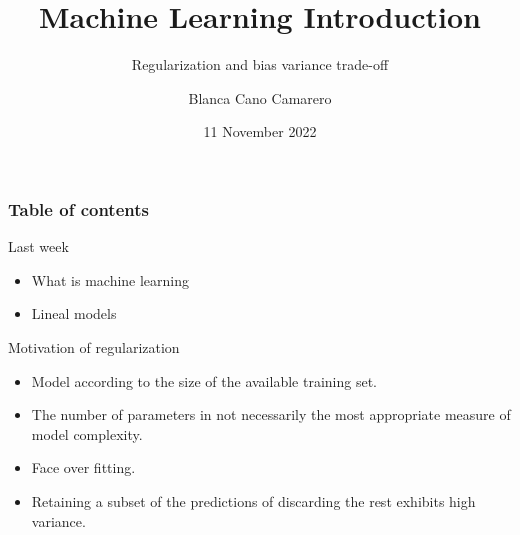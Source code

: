 \documentclass[
  ignorenonframetext,
  aspectratio=32,
]{beamer}
\title{Machine Learning Introduction}
\subtitle{Regularization and bias variance trade-off}
\author{Blanca Cano Camarero}
\date{11 November 2022}
\institute{Universidad Autónoma de Madrid}
\providecommand{\tightlist}{%
  \setlength{\itemsep}{0pt}\setlength{\parskip}{0pt}}\usepackage{longtable,booktabs,array}
\renewcommand*\contentsname{Table of contents}
\newcommand\contentsname{Table of contents}
\begin{document}
\frame{\titlepage}
\ifdefined\Shaded\renewenvironment{Shaded}{\begin{tcolorbox}[borderline west={3pt}{0pt}{shadecolor}, boxrule=0pt, frame hidden, interior hidden, breakable, sharp corners, enhanced]}{\end{tcolorbox}}\fi

\renewcommand*\contentsname{Table of contents}
\begin{frame}[allowframebreaks]
  \frametitle{Table of contents}
  \tableofcontents[hideallsubsections]
\end{frame}
\begin{frame}{Last week}
\protect\hypertarget{last-week}{}
\begin{itemize}
\tightlist
\item
  What is machine learning
\item
  Lineal models
\end{itemize}
\end{frame}

\begin{frame}{Motivation of regularization}
\protect\hypertarget{motivation-of-regularization}{}
\begin{itemize}
\tightlist
\item
  Model according to the size of the available training set.
\item
  The number of parameters in not necessarily the most appropriate
  measure of model complexity.
\item
  Face over fitting.
\item
  Retaining a subset of the predictions of discarding the rest exhibits
  high variance.
\end{itemize}
\end{frame}
\end{document}

